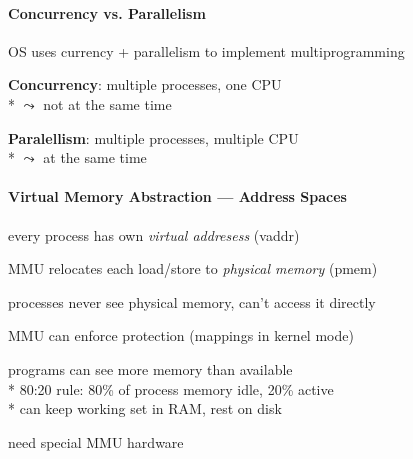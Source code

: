\paragraph{Concurrency vs. Parallelism}
\begin{items}
	\item OS uses currency + parallelism to implement multiprogramming
	\begin{enumeration}
		\item \textbf{Concurrency}: multiple processes, one CPU \\* \( \leadsto \) not at the same time
		\item \textbf{Paralellism}: multiple processes, multiple CPU \\* \( \leadsto \) at the same time
	\end{enumeration}
\end{items}

\paragraph{Virtual Memory Abstraction --- Address Spaces}
\begin{items}
	\item every process has own \emph{virtual addresess} (vaddr)
	\item MMU relocates each load/store to \emph{physical memory} (pmem)
	\item processes never see physical memory, can't access it directly
	\item \textcolor{black!60!green}{\code{+}} MMU can enforce protection (mappings in kernel mode)
	\item \textcolor{black!60!green}{\code{+}} programs can see more memory than available \\*
		\phantom{x} 80:20 rule: 80\% of process memory idle, 20\% active \\*
		\phantom{x} can keep working set in RAM, rest on disk
	\item \textcolor{red}{\code{-}} need special MMU hardware
\end{items}

